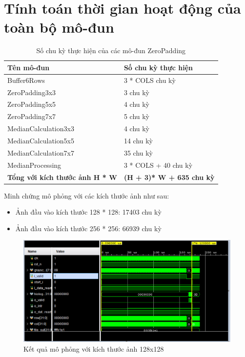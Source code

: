 \section{Tính toán thời gian hoạt động của toàn bộ mô-đun}

\begin{table}[H]
	\centering
	\renewcommand{\arraystretch}{1.3}
		\caption{Số chu kỳ thực hiện của các mô-đun ZeroPadding}
	\begin{tabular}{|p{6cm} p{5cm} |}
		\hline
		\rowcolor{gray!30}
		\textbf{Tên mô-đun} & \textbf{Số chu kỳ thực hiện}  \\
		\hline
		Buffer6Rows  & 3 * COLS chu kỳ
		\\ \hline
		ZeroPadding3x3 & 3 chu kỳ
		\\ \hline
		ZeroPadding5x5 & 4 chu kỳ
		\\ \hline
		ZeroPadding7x7 & 5 chu kỳ
		\\ \hline
		MedianCalculation3x3 & 4 chu kỳ
		\\ \hline
		MedianCalculation5x5 & 14 chu kỳ
		\\ \hline
		MedianCalculation7x7 & 35 chu kỳ
		\\ \hline
		MedianProcessing & 3 * COLS + 40 chu kỳ

		\\ \hline
		\textbf{Tổng với kích thước ảnh H * W} & \textbf{(H + 3)* W + 635 chu kỳ}
		\\ \hline
	\end{tabular}

	\label{tab:numberOfCycleZeroPadding}
\end{table}
Minh chứng mô phỏng với các kích thước ảnh như sau:
\begin{itemize}
	\item Ảnh đầu vào kích thước 128 * 128: 17403 chu kỳ
	\item Ảnh đầu vào kích thước 256 * 256: 66939 chu kỳ
\end{itemize}

\begin{figure}[!ht]
	\centering
	\includegraphics[width=1\linewidth]{figures/simu_time.png}
	\caption{Kết quả mô phỏng với kích thước ảnh 128x128}
	\label{fig:simu_time}
\end{figure}

